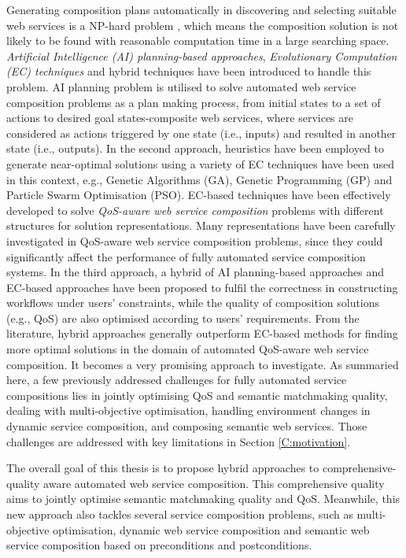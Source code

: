 Generating composition plans automatically in discovering and selecting suitable web services is a NP-hard problem \cite{moghaddam2014service}, which means the composition solution is not likely to be found with reasonable computation time in a large searching space. \emph{Artificial Intelligence (AI) planning-based approaches}, \emph{Evolutionary Computation (EC) techniques} and hybrid techniques have been introduced to handle this problem. AI planning problem is utilised to solve automated web service composition problems as a plan making process, from initial states to a set of actions to desired goal states-composite web services, where services are considered as actions triggered by one state (i.e., inputs) and resulted in another state (i.e., outputs). In the second approach, heuristics have been employed to generate near-optimal solutions using a variety of EC techniques have been used in this context, e.g., Genetic Algorithms (GA), Genetic Programming (GP) and Particle Swarm Optimisation (PSO). EC-based techniques have been effectively developed to solve \emph{QoS-aware web service composition} problems with different structures for solution representations. Many representations have been carefully investigated in QoS-aware web service composition problems, since they could significantly affect the performance of fully automated service composition systems. In the third approach, a hybrid of AI planning-based approaches and EC-based approaches \cite{da2016genetic,ma2015hybrid} have been proposed to fulfil the correctness in constructing workflows under users' constraints, while the quality of composition solutions (e.g., QoS) are also optimised according to users' requirements. From the literature, hybrid approaches generally outperform EC-based methods for finding more optimal solutions in the domain of automated QoS-aware web service composition. It becomes a very promising approach to investigate. As summaried here, a few previously addressed challenges for fully automated service compositions lies in jointly optimising QoS and semantic matchmaking quality, dealing with multi-objective optimisation, handling environment changes in dynamic service composition, and composing semantic web services. Those challenges are addressed with key limitations in Section \ref{C:motivation}. 

The overall goal of this thesis is to propose hybrid approaches to comprehensive-quality aware automated web service composition. This comprehensive quality aims to jointly optimise semantic matchmaking quality and QoS. Meanwhile, this new approach also tackles several service composition problems, such as multi-objective optimisation, dynamic web service composition and semantic web service composition based on preconditions and postconditions.

